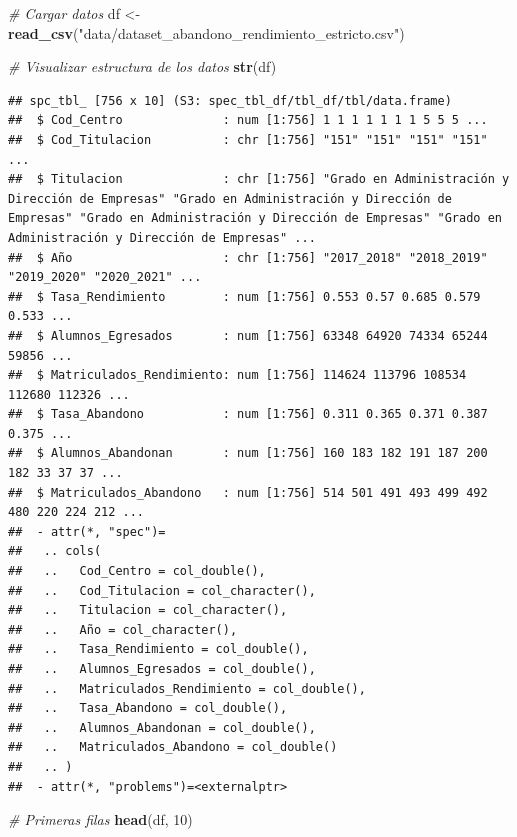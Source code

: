 \documentclass[
]{article}
\newenvironment{Shaded}{\begin{snugshade}}{\end{snugshade}}
\newcommand{\CommentTok}[1]{\textcolor[rgb]{0.56,0.35,0.01}{\textit{#1}}}
\newcommand{\DecValTok}[1]{\textcolor[rgb]{0.00,0.00,0.81}{#1}}
\newcommand{\FunctionTok}[1]{\textcolor[rgb]{0.13,0.29,0.53}{\textbf{#1}}}
\newcommand{\NormalTok}[1]{#1}
\newcommand{\OtherTok}[1]{\textcolor[rgb]{0.56,0.35,0.01}{#1}}
\newcommand{\StringTok}[1]{\textcolor[rgb]{0.31,0.60,0.02}{#1}}
\begin{document}
\begin{Shaded}
\begin{Highlighting}[]
\CommentTok{\# Cargar datos}
\NormalTok{df }\OtherTok{\textless{}{-}} \FunctionTok{read\_csv}\NormalTok{(}\StringTok{"data/dataset\_abandono\_rendimiento\_estricto.csv"}\NormalTok{)}

\CommentTok{\# Visualizar estructura de los datos}
\FunctionTok{str}\NormalTok{(df)}
\end{Highlighting}
\end{Shaded}

\begin{verbatim}
## spc_tbl_ [756 x 10] (S3: spec_tbl_df/tbl_df/tbl/data.frame)
##  $ Cod_Centro              : num [1:756] 1 1 1 1 1 1 1 5 5 5 ...
##  $ Cod_Titulacion          : chr [1:756] "151" "151" "151" "151" ...
##  $ Titulacion              : chr [1:756] "Grado en Administración y Dirección de Empresas" "Grado en Administración y Dirección de Empresas" "Grado en Administración y Dirección de Empresas" "Grado en Administración y Dirección de Empresas" ...
##  $ Año                     : chr [1:756] "2017_2018" "2018_2019" "2019_2020" "2020_2021" ...
##  $ Tasa_Rendimiento        : num [1:756] 0.553 0.57 0.685 0.579 0.533 ...
##  $ Alumnos_Egresados       : num [1:756] 63348 64920 74334 65244 59856 ...
##  $ Matriculados_Rendimiento: num [1:756] 114624 113796 108534 112680 112326 ...
##  $ Tasa_Abandono           : num [1:756] 0.311 0.365 0.371 0.387 0.375 ...
##  $ Alumnos_Abandonan       : num [1:756] 160 183 182 191 187 200 182 33 37 37 ...
##  $ Matriculados_Abandono   : num [1:756] 514 501 491 493 499 492 480 220 224 212 ...
##  - attr(*, "spec")=
##   .. cols(
##   ..   Cod_Centro = col_double(),
##   ..   Cod_Titulacion = col_character(),
##   ..   Titulacion = col_character(),
##   ..   Año = col_character(),
##   ..   Tasa_Rendimiento = col_double(),
##   ..   Alumnos_Egresados = col_double(),
##   ..   Matriculados_Rendimiento = col_double(),
##   ..   Tasa_Abandono = col_double(),
##   ..   Alumnos_Abandonan = col_double(),
##   ..   Matriculados_Abandono = col_double()
##   .. )
##  - attr(*, "problems")=<externalptr>
\end{verbatim}

\begin{Shaded}
\begin{Highlighting}[]
\CommentTok{\# Primeras filas}
\FunctionTok{head}\NormalTok{(df, }\DecValTok{10}\NormalTok{)}
\end{Highlighting}
\end{Shaded}
\end{document}
